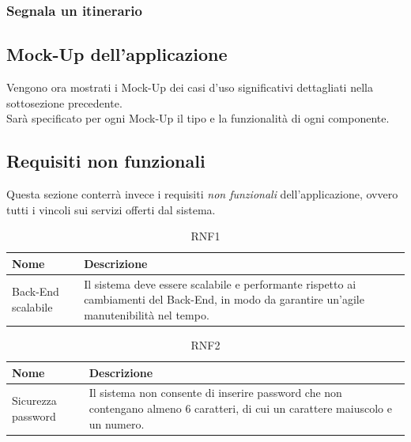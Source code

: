 \documentclass{natourDoc}
\begin{document}

	\subsubsection{Segnala un itinerario}


	\subsection{Mock-Up dell'applicazione}
	Vengono ora mostrati i Mock-Up dei casi d'uso significativi dettagliati nella sottosezione precedente.\\
	Sarà specificato per ogni Mock-Up il tipo e la funzionalità di ogni componente.

	\newpage

	\subsection{Requisiti non funzionali}
	Questa sezione conterrà invece i requisiti \textit{non funzionali} dell'applicazione, ovvero tutti i vincoli sui servizi offerti dal sistema.

	\begin{table}[H]
		\centering
		\begin{tabular}{ |p{5cm}|p{10.3cm}| } 
			\hline
			\rowcolor{PineGreen!70}
			\textbf{Nome} & \textbf{Descrizione} \\
			\hline
			Back-End scalabile & Il sistema deve essere scalabile e performante rispetto ai cambiamenti del Back-End,
			in modo da garantire un'agile manutenibilità nel tempo. \\
			\hline
		\end{tabular}
		\caption{RNF1}
		\label{table:21}
	\end{table}
	
	\begin{table}[H]
		\centering
		\begin{tabular}{ |p{5cm}|p{10.3cm}| } 
			\hline
			\rowcolor{PineGreen!70}
			\textbf{Nome} & \textbf{Descrizione} \\
			\hline
			Sicurezza password & Il sistema non consente di inserire password che non contengano 
			almeno 6 caratteri, di cui un carattere maiuscolo e un numero.\\
			\hline
		\end{tabular}
		\caption{RNF2}
		\label{table:22}
	\end{table}
\end{document}

